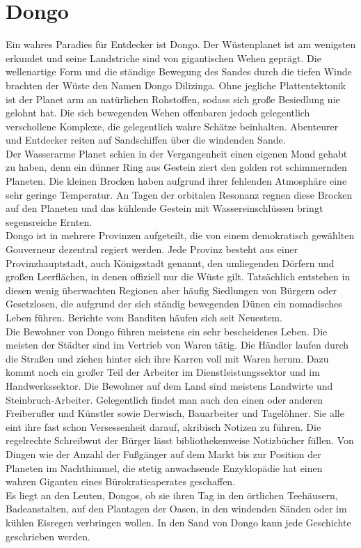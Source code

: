 \documentclass{book}
\begin{document}
\section{Dongo}
    Ein wahres Paradies für Entdecker ist Dongo. Der Wüstenplanet ist am wenigsten erkundet und seine Landstriche sind von gigantischen Wehen geprägt. Die wellenartige Form und die ständige Bewegung des Sandes durch die tiefen Winde brachten der Wüste den Namen Dongo Dilizinga. Ohne jegliche Plattentektonik ist der Planet arm an natürlichen Rohstoffen, sodass sich große Besiedlung nie gelohnt hat. Die sich bewegenden Wehen offenbaren jedoch gelegentlich verschollene Komplexe, die gelegentlich wahre Schätze beinhalten. Abenteurer und Entdecker reiten auf Sandschiffen über die windenden Sande.\\
    Der Wasserarme Planet schien in der Vergangenheit einen eigenen Mond gehabt zu haben, denn ein dünner Ring aus Gestein ziert den golden rot schimmernden Planeten. Die kleinen Brocken haben aufgrund ihrer fehlenden Atmosphäre eine sehr geringe Temperatur. An Tagen der orbitalen Resonanz regnen diese Brocken auf den Planeten und das kühlende Gestein mit Wassereinschlüssen bringt segensreiche Ernten.\\
    Dongo ist in mehrere Provinzen aufgeteilt, die von einem demokratisch gewählten Gouverneur dezentral regiert werden. Jede Provinz besteht aus einer Provinzhauptstadt, auch Königsstadt genannt, den umliegenden Dörfern und großen Leerflächen, in denen offiziell nur die Wüste gilt. Tatsächlich entstehen in diesen wenig überwachten Regionen aber häufig Siedlungen von Bürgern oder Gesetzlosen, die aufgrund der sich ständig bewegenden Dünen ein nomadisches Leben führen. Berichte vom Banditen häufen sich seit Neuestem.\\
    Die Bewohner von Dongo führen meistens ein sehr bescheidenes Leben. Die meisten der Städter sind im Vertrieb von Waren tätig. Die Händler laufen durch die Straßen und ziehen hinter sich ihre Karren voll mit Waren herum. Dazu kommt noch ein großer Teil der Arbeiter im Dienstleistungssektor und im Handwerkssektor. Die Bewohner auf dem Land sind meistens Landwirte und Steinbruch-Arbeiter. Gelegentlich findet man auch den einen oder anderen Freiberufler und Künstler sowie Derwisch, Bauarbeiter und Tagelöhner. Sie alle eint ihre fast schon Versessenheit darauf, akribisch Notizen zu führen. Die regelrechte Schreibwut der Bürger lässt bibliothekenweise Notizbücher füllen. Von Dingen wie der Anzahl der Fußgänger auf dem Markt bis zur Position der Planeten im Nachthimmel, die stetig anwachsende Enzyklopädie hat einen wahren Giganten eines Bürokratieaperates geschaffen.\\
    Es liegt an den Leuten, Dongos, ob sie ihren Tag in den örtlichen Teehäusern, Badeanstalten, auf den Plantagen der Oasen, in den windenden Sänden oder im kühlen Eisregen verbringen wollen. In den Sand von Dongo kann jede Geschichte geschrieben werden.
\end{document}
